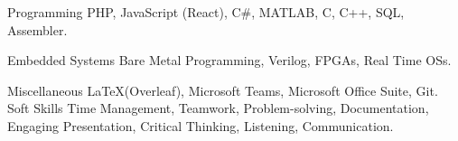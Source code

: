 

\begin{cvskills}

  \cvskill
    {Programming} %
    {PHP, JavaScript (React), C\#, MATLAB, C, C++, SQL, Assembler.} %

  \cvskill
    {Embedded Systems} %
    {Bare Metal Programming, Verilog, FPGAs, Real Time OSs. } %

  \cvskill
    {Miscellaneous} %
    {\LaTeX (Overleaf), Microsoft Teams, Microsoft Office Suite, Git.} %
  \cvskill
    {Soft Skills} %
    {Time Management, Teamwork, Problem-solving, Documentation, Engaging Presentation, Critical Thinking, Listening, Communication.} %

\end{cvskills}
